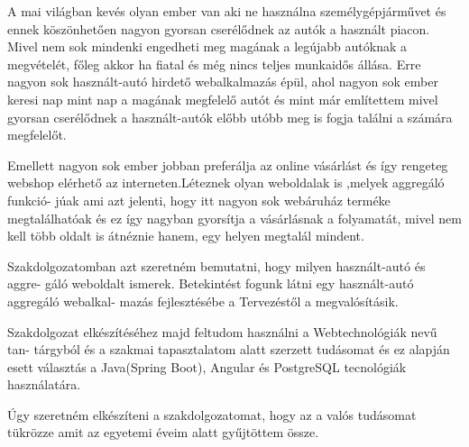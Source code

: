 
A mai világban kevés olyan ember van aki ne használna személygépjárművet és ennek köszönhetően nagyon gyorsan cserélődnek az autók a használt piacon. Mivel nem sok mindenki engedheti meg magának a legújabb autóknak a megvételét, főleg akkor ha fiatal és még nincs teljes munkaidős állása. Erre nagyon sok használt-autó hirdető webalkalmazás épül, ahol nagyon sok ember keresi nap mint nap a magának megfelelő autót és mint már említettem mivel gyorsan cserélődnek a használt-autók előbb utóbb meg is fogja találni a számára megfelelőt.

Emellett nagyon sok ember jobban preferálja az online vásárlást és így rengeteg webshop elérhető az interneten.Léteznek olyan weboldalak is ,melyek aggregáló funkció-
júak ami azt jelenti, hogy itt nagyon sok webáruház terméke megtalálhatóak és ez így nagyban gyorsítja a vásárlásnak a folyamatát, mivel nem kell több oldalt is átnéznie hanem, egy helyen megtalál mindent.

Szakdolgozatomban azt szeretném bemutatni, hogy milyen használt-autó és aggre-
gáló weboldalt ismerek. Betekintést fogunk látni egy használt-autó aggregáló webalkal-
mazás fejlesztésébe a Tervezéstől a megvalósításik. 

Szakdolgozat elkészítéséhez majd feltudom használni a Webtechnológiák nevű tan-
tárgyból és a szakmai tapasztalatom alatt szerzett tudásomat és ez alapján esett választás a Java(Spring Boot), Angular és PostgreSQL tecnológiák használatára.

Úgy szeretném elkészíteni a szakdolgozatomat, hogy az a valós tudásomat tükrözze amit az egyetemi éveim alatt gyűjtöttem össze.